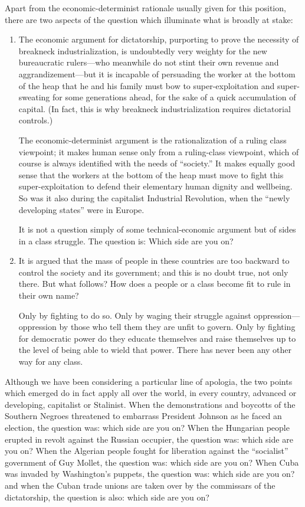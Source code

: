 Apart from the economic-determinist rationale usually given for this position, there are two aspects of the question which illuminate what is broadly at stake:

\begin{enumerate}
\item The economic argument for dictatorship, purporting to prove the necessity of breakneck industrialization, is undoubtedly very weighty for the new bureaucratic rulers---who meanwhile do not stint their own revenue and aggrandizement---but it is incapable of persuading the worker at the bottom of the heap that he and his family must bow to super-exploitation and super-sweating for some generations ahead, for the sake of a quick accumulation of capital. (In fact, this is why breakneck industrialization requires dictatorial controls.)

The economic-determinist argument is the rationalization of a ruling class viewpoint; it makes human sense only from a ruling-class viewpoint, which of course is always identified with the needs of ``society.'' It makes equally good sense that the workers at the bottom of the heap must move to fight this super-exploitation to defend their elementary human dignity and wellbeing. So was it also during the capitalist Industrial Revolution, when the ``newly developing states'' were in Europe.

It is not a question simply of some technical-economic argument but of sides in a class struggle. The question is: Which side are you on?

\item It is argued that the mass of people in these countries are too backward to control the society and its government; and this is no doubt true, not only there. But what follows? How does a people or a class become fit to rule in their own name?

Only by fighting to do so. Only by waging their struggle against oppression---oppression by those who tell them they are unfit to govern. Only by fighting for democratic power do they educate themselves and raise themselves up to the level of being able to wield that power. There has never been any other way for any class.
\end{enumerate}

Although we have been considering a particular line of apologia, the two points which emerged do in fact apply all over the world, in every country, advanced or developing, capitalist or Stalinist. When the demonstrations and boycotts of the Southern Negroes threatened to embarrass President Johnson as he faced an election, the question was: which side are you on? When the Hungarian people erupted in revolt against the Russian occupier, the question was: which side are you on? When the Algerian people fought for liberation against the ``socialist'' government of Guy Mollet, the question was: which side are you on? When Cuba was invaded by Washington's puppets, the question was: which side are you on? and when the Cuban trade unions are taken over by the commissars of the dictatorship, the question is also: which side are you on?

